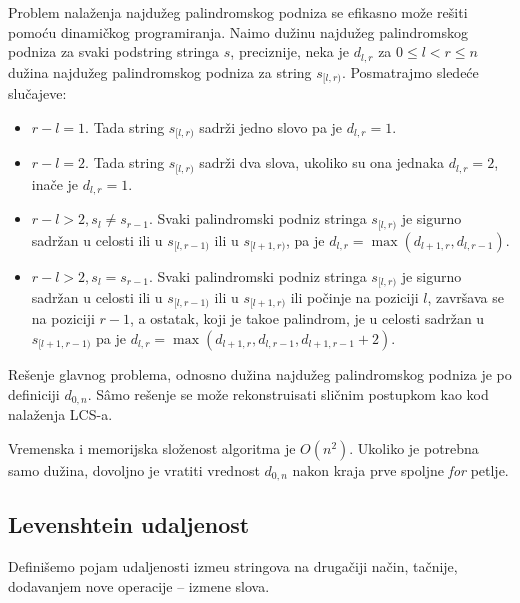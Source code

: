Problem nala\v zenja najdu\v zeg palindromskog podniza se efikasno mo\v ze re\v siti pomo\' cu dinami\v ckog programiranja. Na\dj imo du\v zinu najdu\v zeg palindromskog podniza za svaki podstring stringa $s$, preciznije, neka je $d_{l,r}$ za $0 \leq l < r \leq n$ du\v zina najdu\v zeg palindromskog podniza za string $s_{[l,r)}$. Posmatrajmo slede\' ce slu\v cajeve:

\begin{itemize}
    \item $r-l = 1$. Tada string $s_{[l,r)}$ sadr\v zi jedno slovo pa je $d_{l,r} = 1$.
    \item $r-l = 2$. Tada string $s_{[l,r)}$ sadr\v zi dva slova, ukoliko su ona jednaka $d_{l,r} = 2$, ina\v ce je $d_{l,r} = 1$.
    \item $r-l > 2, s_l \not = s_{r-1}$. Svaki palindromski podniz stringa $s_{[l, r)}$ je sigurno sadr\v zan u celosti ili u $s_{[l, r-1)}$ ili u $s_{[l+1, r)}$, pa je $d_{l,r} = \max(d_{l+1,r}, d_{l,r-1})$.
    \item $r-l > 2, s_l = s_{r-1}$. Svaki palindromski podniz stringa $s_{[l, r)}$ je sigurno sadr\v zan u celosti ili u $s_{[l, r-1)}$ ili u $s_{[l+1, r)}$ ili po\v cinje na poziciji $l$, zavr\v sava se na poziciji $r-1$, a ostatak, koji je tako\dj e palindrom, je u celosti sadr\v zan u $s_{[l+1,r-1)}$ pa je $d_{l,r} = \max(d_{l+1,r}, d_{l,r-1}, d_{l+1,r-1}+2)$.
\end{itemize}

Re\v senje glavnog problema, odnosno du\v zina najdu\v zeg palindromskog podniza je po definiciji $d_{0,n}$. S\^amo re\v senje se mo\v ze rekonstruisati sli\v cnim postupkom kao kod nala\v zenja LCS-a.

\noindent
\begin{minipage}[l]{\textwidth}

\end{minipage}

Vremenska i memorijska slo\v zenost algoritma je $O(n^2)$. Ukoliko je potrebna samo du\v zina, dovoljno je vratiti vrednost $d_{0,n}$ nakon kraja prve spoljne \textit{for} petlje.

\subsection{Levenshtein udaljenost}

Defini\v semo pojam udaljenosti izme\dj u stringova na druga\v ciji na\v cin, ta\v cnije, dodavanjem nove operacije -- izmene slova.

